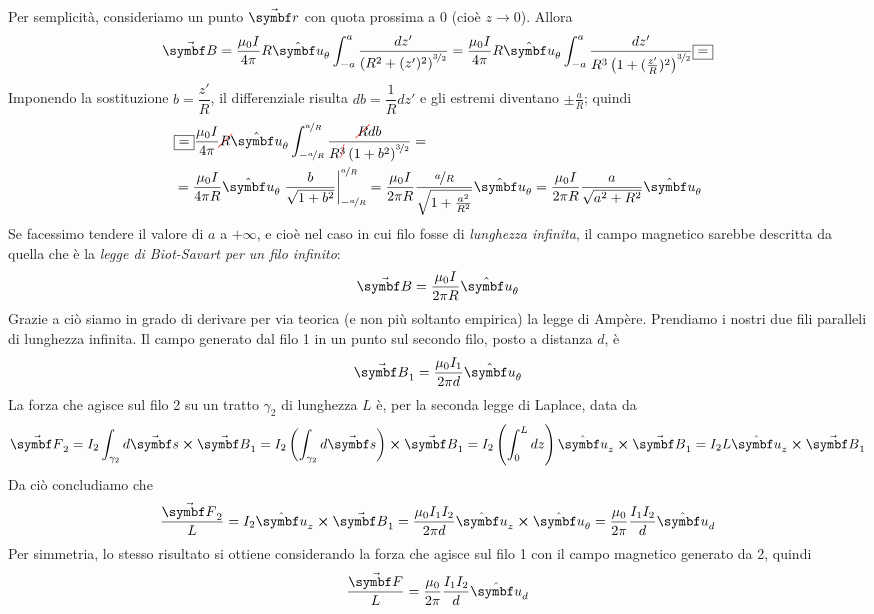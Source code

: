 Per semplicità, consideriamo un punto $\vba{r}$ con quota prossima a $0$ (cioè $z\to 0$). Allora
\begin{equation*}
	\vba{B}=\frac{\mu_0 I}{4\pi}R\vbh{u}_{\theta}\int_{-a}^{a}\frac{dz'}{\left(R^2+(z')^2\right)^{\nicefrac{3}{2}}}=\frac{\mu_0 I}{4\pi}R\vbh{u}_{\theta}\int_{-a}^{a}\frac{dz'}{R^3\left(1+(\frac{z'}{R})^2\right)^{\nicefrac{3}{2}}}\squarequal
\end{equation*}
Imponendo la sostituzione $b=\dfrac{z'}{R}$, il differenziale risulta $db=\dfrac{1}{R}dz'$ e gli estremi diventano $\pm\frac{a}{R}$; quindi
\begin{align*}
	&\squarequal\frac{\mu_0 I}{4\pi}\Ccancel[red]{R}\vbh{u}_{\theta}\int_{-\nicefrac{a}{R}}^{\nicefrac{a}{R}}\frac{\Ccancel[red]{R}db}{R^{\Ccancel[red]{3}}\left(1+b^2\right)^{\nicefrac{3}{2}}}=\\
	&=\frac{\mu_0 I}{4\pi R}\vbh{u}_{\theta}\eval{\frac{b}{\sqrt{1+b^2}}}_{-\nicefrac{a}{R}}^{\nicefrac{a}{R}}=\frac{\mu_0 I}{2\pi R}\frac{\nicefrac{a}{R}}{\sqrt{1+\frac{a^2}{R^2}}}\vbh{u}_{\theta}=\frac{\mu_0 I}{2\pi R}\frac{a}{\sqrt{a^2+R^2}}\vbh{u}_{\theta}
\end{align*}
Se facessimo tendere il valore di $a$ a $+\infty$, e cioè nel caso in cui filo fosse di \textit{lunghezza infinita}, il campo magnetico sarebbe descritta da quella che è la \textit{legge di Biot-Savart per un filo infinito}:
\begin{equation}
	\vba{B}=\frac{\mu_0 I}{2\pi R}\vbh{u}_{\theta}
\end{equation}
Grazie a ciò siamo in grado di derivare per via teorica (e non più soltanto empirica) la legge di Ampère. Prendiamo i nostri due fili paralleli di lunghezza infinita. Il campo generato dal filo 1 in un punto sul secondo filo, posto a distanza $d$, è
\begin{equation*}
	\vba{B}_1=\frac{\mu_0 I_1}{2\pi d}\vbh{u}_\theta
\end{equation*}
La forza che agisce sul filo 2 su un tratto $\gamma_2$ di lunghezza $L$ è, per la seconda legge di Laplace, data da
\begin{equation*}
	\vba{F}_2=I_2\int_{\gamma_2}d\vba{s}\cross\vba{B}_1=I_2\left(\int_{\gamma_2}d\vba{s}\right)\cross\vba{B}_1=I_2\left(\int_{0}^Ldz\right)\vbh{u}_z\cross\vba{B}_1=I_2L\vbh{u}_z\cross\vba{B}_1
\end{equation*}
Da ciò concludiamo che 
\begin{equation*}
	\frac{\vba{F}_2}{L}=I_2\vbh{u}_z\cross\vba{B}_1=\frac{\mu_0 I_1 I_2}{2\pi d}\vbh{u}_z\cross\vbh{u}_{\theta}=\frac{\mu_0}{2\pi}\frac{I_1I_2}{d}\vbh{u}_d
\end{equation*}
Per simmetria, lo stesso risultato si ottiene considerando la forza che agisce sul filo 1 con il campo magnetico generato da 2, quindi
\begin{equation}
	\frac{\vba{F}}{L}=\frac{\mu_0}{2\pi}\frac{I_1I_2}{d}\vbh{u}_d
\end{equation}
